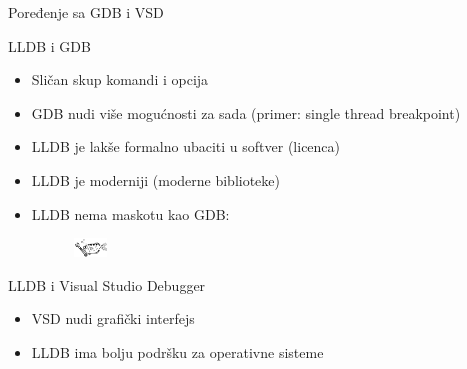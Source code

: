 \documentclass[bookmarks=true,bookmarksopen=true,pdfborder={0 0 0},pdfhighlight={/N},linkbordercolor={.5 .5 .5},implicit=false,unicode,xcolor={table}]{beamer}
\begin{document}
\begin{frame}{Poređenje sa GDB i VSD}
	
	LLDB i GDB
	\begin{itemize}
		\item Sličan skup komandi i opcija
		\item GDB nudi više mogućnosti za sada (primer: single thread breakpoint)
		\item LLDB je lakše formalno ubaciti u softver (licenca)
		\item LLDB je moderniji (moderne biblioteke)
		\item LLDB nema maskotu kao GDB:
		\begin{figure}
			\includegraphics[width=10mm,height=5mm]{Slike/gdb_mascot.png}
		\end{figure}
	\end{itemize}
	
	LLDB i Visual Studio Debugger
	\begin{itemize}
		\item VSD nudi grafički interfejs
		\item LLDB ima bolju podršku za operativne sisteme
	\end{itemize}

\end{frame}

\begin{frame}{}
\end{frame}
\end{document}
